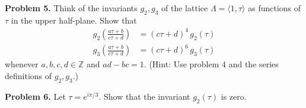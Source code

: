 \documentclass[12pt]{amsart}
\newcommand{\ZZ}{{\mathbb Z}}
\newcommand{\vs}{\vspace{2mm}}
\begin{document}
\noindent
{\bf Problem 5.} Think of the invariants $g_2,g_3$ of the lattice $\Lambda=\langle 1, \tau \rangle$ as functions of $\tau$ in the upper half-plane. Show that 
\begin{align*}
g_2 \left( \frac{a\tau+b}{c\tau+d} \right) & = (c \tau+d)^4 \, g_2(\tau) \\
g_3 \left( \frac{a\tau+b}{c\tau+d} \right) & = (c \tau+d)^6 \, g_3(\tau)
\end{align*}
whenever $a,b,c,d \in \ZZ$ and $ad-bc=1$. (Hint: Use problem 4 and the series definitions of $g_2,g_3$.) \vs 

\noindent
{\bf Problem 6.} Let $\tau=e^{i \pi/3}$. Show that the invariant $g_2(\tau)$ is zero. 
 
\end{document}
